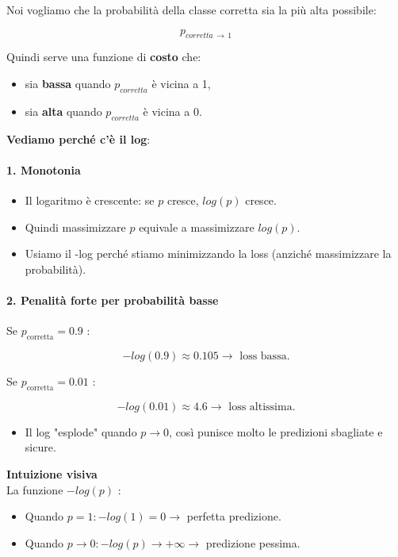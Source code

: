 \documentclass[
  11pt,
]{article}
\begin{document}
Noi vogliamo che la probabilità della classe corretta sia la più alta
possibile:

\[p_{corretta\, \rightarrow \, 1}\]

Quindi serve una funzione di \textbf{costo} che:

\begin{itemize}
\item
  sia \textbf{bassa} quando \(p_{corretta}\) è vicina a 1,
\item
  sia \textbf{alta} quando \(p_{corretta}\) è vicina a 0.
\end{itemize}

\textbf{Vediamo perché c'è il log}:

\paragraph{1. \textbf{Monotonia}}

\begin{itemize}
\item
  Il logaritmo è crescente: se \(p\) cresce, \(log(p)\) cresce.
\item
  Quindi massimizzare \(p\) equivale a massimizzare \(log(p)\).
\item
  Usiamo il -log perché stiamo minimizzando la loss (anziché
  massimizzare la probabilità).
\end{itemize}

\paragraph{2. \textbf{Penalità forte per probabilità basse}}

Se \(p_{\text{corretta}} = 0.9\) :


\[- log(0.9) \approx 0.105 \rightarrow \text{ loss bassa.}\]


Se \(p_{\text{corretta}} = 0.01\) :


\[- log(0.01) \approx 4.6 \rightarrow \text{ loss altissima.}\]


\begin{itemize}
\item
  Il log "esplode" quando \(p \rightarrow 0\), così punisce molto le
  predizioni sbagliate e sicure.
\end{itemize}

\textbf{Intuizione visiva}\\
La funzione \(- log(p)\) :

\begin{itemize}
\item
  Quando \(p = 1: - log(1) = 0 \rightarrow\) perfetta predizione.
\item
  Quando \(p \rightarrow 0: - log(p) \rightarrow + \infty \rightarrow\)
  predizione pessima.
\end{itemize}
\end{document}

